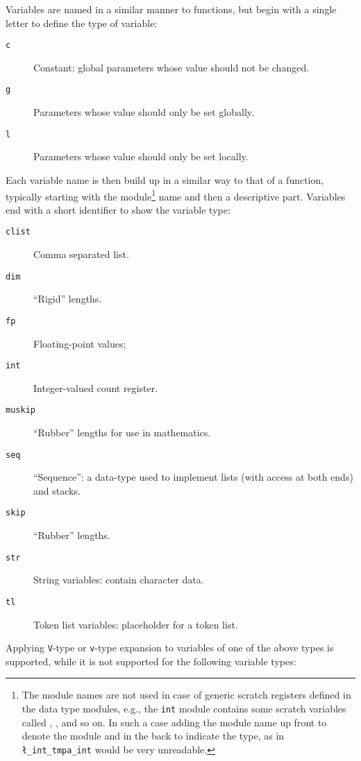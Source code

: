 \documentclass[dvipdfmx,full,kernel]{wtpl3doc}
\begin{document}
Variables are named in a similar manner to functions, but begin with
a single letter to define the type of variable:
\begin{description}
  \item[\texttt{c}] Constant: global parameters whose value should not
    be changed.
  \item[\texttt{g}] Parameters whose value should only be set globally.
  \item[\texttt{l}] Parameters whose value should only be set locally.
\end{description}
Each variable name is then build up in a similar way to that of a
function, typically starting with the module\footnote{The module names are
  not used in case of generic scratch registers defined in the data
  type modules, e.g., the
  \texttt{int} module contains some scratch variables called ,
  , and so on. In such a case adding the module name up front
  to denote the module
  and in the back to indicate the type, as in
  \texttt{\string\l_int_tmpa_int} would be very unreadable.}  name
and then a descriptive part.
Variables end with a short identifier to show the variable type:
\begin{description}
  \item[\texttt{clist}] Comma separated list.
  \item[\texttt{dim}] \enquote{Rigid} lengths.
  \item[\texttt{fp}] Floating-point values;
  \item[\texttt{int}] Integer-valued count register.
  \item[\texttt{muskip}] \enquote{Rubber} lengths for use in
    mathematics.
  \item[\texttt{seq}] \enquote{Sequence}: a data-type used to implement
    lists (with access at both ends) and stacks.
  \item[\texttt{skip}] \enquote{Rubber} lengths.
  \item[\texttt{str}] String variables: contain character data.
  \item[\texttt{tl}] Token list variables: placeholder for a token list.
\end{description}
Applying \texttt{V}-type or \texttt{v}-type expansion to variables of
one of the above types is supported, while it is not supported for the
following variable types:
\end{document}
